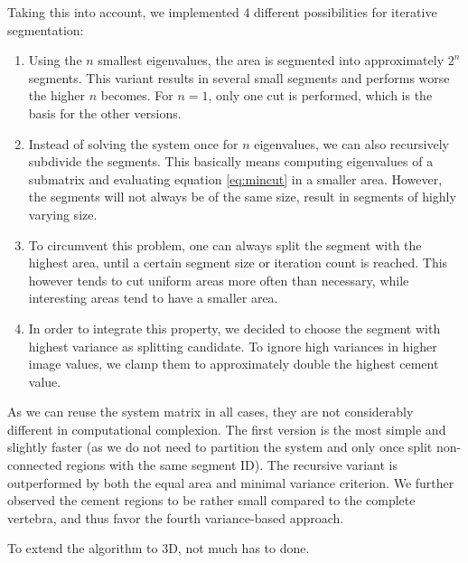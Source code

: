 \documentclass{article}
\begin{document}
  Taking this into account, we implemented 4 different possibilities for iterative segmentation:
  \begin{enumerate}
    \item
    Using the $n$ smallest eigenvalues, the area is segmented into approximately $2^n$ segments.
    This variant results in several small segments and performs worse the higher $n$ becomes.
    For $n = 1$, only one cut is performed, which is the basis for the other versions.
    \item
    Instead of solving the system once for $n$ eigenvalues, we can also recursively subdivide the segments.
    This basically means computing eigenvalues of a submatrix and evaluating equation \ref{eq:mincut} in a smaller area.
    However, the segments will not always be of the same size, result in segments of highly varying size.
    \item
    To circumvent this problem, one can always split the segment with the highest area, until a certain segment size or iteration count is reached.
    This however tends to cut uniform areas more often than necessary, while interesting areas tend to have a smaller area.
    \item
    In order to integrate this property, we decided to choose the segment with highest variance as splitting candidate.
    To ignore high variances in higher image values, we clamp them to approximately double the highest cement value.
  \end{enumerate}
  
  As we can reuse the system matrix in all cases, they are not considerably different in computational complexion.
  The first version is the most simple and slightly faster (as we do not need to partition the system and only once split non-connected regions with the same segment ID).
  The recursive variant is outperformed by both the equal area and minimal variance criterion.
  We further observed the cement regions to be rather small compared to the complete vertebra, and thus favor the fourth variance-based approach.
  
  To extend the algorithm to 3D, not much has to done.
  
\end{document}
